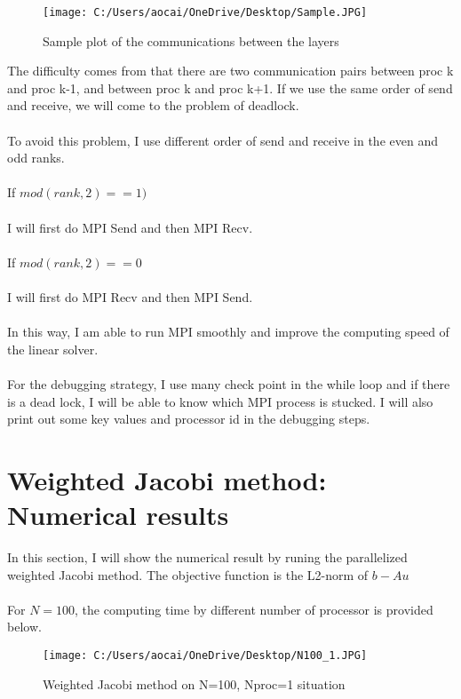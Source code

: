 \documentclass[12pt]{article}
\begin{document}
\begin{figure}[H]
	\centering
	\texttt{[image: C:/Users/aocai/OneDrive/Desktop/Sample.JPG]}
	\caption[Optional caption]{Sample plot of the communications between the layers}
	\label{fig:1}
\end{figure}

The difficulty comes from that there are two communication pairs between proc k and proc k-1, and between proc k and proc k+1. If we use the same order of send and receive, we will come to the problem of deadlock.\\\\
To avoid this problem, I use different order of send and receive in the even and odd ranks.\\\\
If $mod(rank,2)==1)$\\\\
I will first do MPI Send and then MPI Recv.\\\\
If $mod(rank,2)==0$\\\\
I will first do MPI Recv and then MPI Send.\\\\
In this way, I am able to run MPI smoothly and improve the computing speed of the linear solver.\\\\
For the debugging strategy, I use many check point in the while loop and if there is a dead lock, I will be able to know which MPI process is stucked. I will also print out some key values and processor id in the debugging steps.
 
\section{Weighted Jacobi method: Numerical results}
In this section, I will show the numerical result by runing the parallelized weighted Jacobi method. The objective function is the L2-norm of $b-Au$\\\\
For $N=100$, the computing time by different number of processor is provided below. 

\begin{figure}[H]
	\centering
	\texttt{[image: C:/Users/aocai/OneDrive/Desktop/N100\_1.JPG]}
	\caption[Optional caption]{Weighted Jacobi method on N=100, Nproc=1 situation}
	\label{fig:N1001}
\end{figure}
\end{document}
